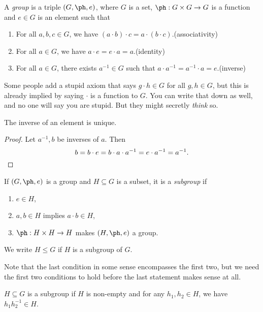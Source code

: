 \documentclass[a4paper]{article}
\begin{document}
\begin{defi}[Group]
  A \emph{group} is a triple $(G, \ph, e)$, where $G$ is a set, $\ph: G\times G \to G$ is a function and $e \in G$ is an element such that
  \begin{enumerate}
    \item For all $a, b, c \in G$, we have $(a \cdot b) \cdot c = a \cdot (b \cdot c)$.\hfill (associativity)
    \item For all $a \in G$, we have $a \cdot e = e \cdot a = a$.\hfill (identity)
    \item For all $a \in G$, there exists $a^{-1} \in G$ such that $a \cdot a^{-1} = a^{-1} \cdot a = e$.\hfill (inverse)
  \end{enumerate}
\end{defi}
Some people add a stupid axiom that says $g \cdot h \in G$ for all $g, h \in G$, but this is already implied by saying $\cdot$ is a function to $G$. You can write that down as well, and no one will say you are stupid. But they might secretly \emph{think} so.

\begin{lemma}
  The inverse of an element is unique.
\end{lemma}

\begin{proof}
  Let $a^{-1}, b$ be inverses of $a$. Then
  \[
    b = b \cdot e = b \cdot a \cdot a^{-1} = e \cdot a^{-1} = a^{-1}. \qedhere
  \]
\end{proof}

\begin{defi}[Subgroup]
  If $(G, \ph, e)$ is a group and $H \subseteq G$ is a subset, it is a \emph{subgroup} if
  \begin{enumerate}
    \item $e \in H$,
    \item $a, b \in H$ implies $a\cdot b\in H$,
    \item $\ph: H \times H \to H$ makes $(H, \ph, e)$ a group.
  \end{enumerate}
  We write $H \leq G$ if $H$ is a subgroup of $G$.
\end{defi}
Note that the last condition in some sense encompasses the first two, but we need the first two conditions to hold before the last statement makes sense at all.

\begin{lemma}
  $H \subseteq G$ is a subgroup if $H$ is non-empty and for any $h_1, h_2 \in H$, we have $h_1h_2^{-1} \in H$.
\end{lemma}
\end{document}
